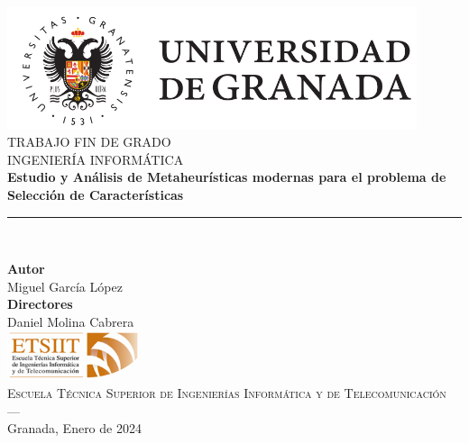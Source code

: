 \begin{titlepage}
 
 
\newlength{\centeroffset}
\setlength{\centeroffset}{-0.5\oddsidemargin}
\addtolength{\centeroffset}{0.5\evensidemargin}
\thispagestyle{empty}

\noindent\hspace*{\centeroffset}\begin{minipage}{\textwidth}

\centering
\includegraphics[width=0.9\textwidth]{imagenes/UGR-MARCA-02-color.png}\\[1.4cm]

\textsc{ \Large TRABAJO FIN DE GRADO\\[0.2cm]}
\textsc{ INGENIERÍA INFORMÁTICA}\\[1cm]
% 
{\Huge\bfseries Estudio y Análisis de Metaheurísticas modernas para el problema de Selección de Características\\
}
\noindent\rule[-1ex]{\textwidth}{3pt}\\[3.5ex]
\end{minipage}

\vspace{1.4cm}
\noindent\hspace*{\centeroffset}\begin{minipage}{\textwidth}
\centering

\textbf{Autor}\\ {Miguel García López}\\[2.5ex]
\textbf{Directores}\\
{Daniel Molina Cabrera}\\[2cm]
\includegraphics[width=0.3\textwidth]{imagenes/etsiit_logo.png}\\[0.1cm]
\textsc{Escuela Técnica Superior de Ingenierías Informática y de Telecomunicación}\\
\textsc{---}\\
Granada, Enero de 2024
\end{minipage}
\end{titlepage}

